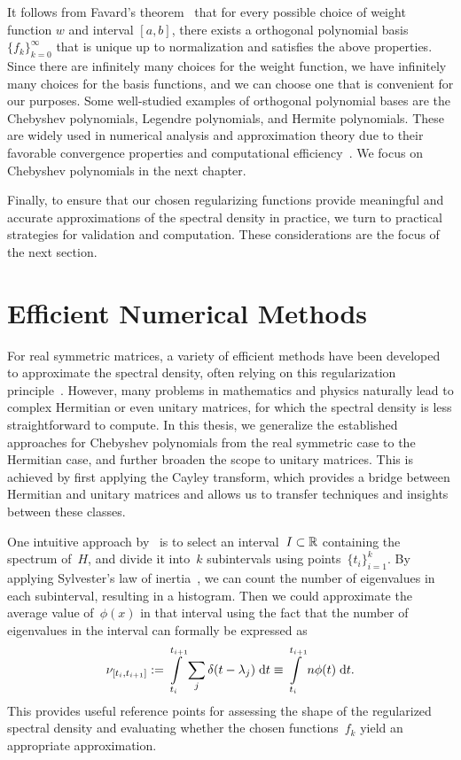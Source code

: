 It follows from Favard's theorem~\cite[Thm.~2.1]{szego1975} that for every possible choice of weight function $w$ and interval $[a, b]$, there exists a orthogonal polynomial basis $\{f_k\}_{k=0}^{\infty}$ that is unique up to normalization and satisfies the above properties. Since there are infinitely many choices for the weight function, we have infinitely many choices for the basis functions, and we can choose one that is convenient for our purposes. Some well-studied examples of orthogonal polynomial bases are the Chebyshev polynomials, Legendre polynomials, and Hermite polynomials. These are widely used in numerical analysis and approximation theory due to their favorable convergence properties and computational efficiency~\cite{masonhandscomb}. We focus on Chebyshev polynomials in the next chapter.

Finally, to ensure that our chosen regularizing functions provide meaningful and accurate approximations of the spectral density in practice, we turn to practical strategies for validation and computation. These considerations are the focus of the next section.

\section{Efficient Numerical Methods}
For real symmetric matrices, a variety of efficient methods have been developed to approximate the spectral density, often relying on this regularization principle~\cite{weisse2006,linsaadyang14,golub2013matrix}. However, many problems in mathematics and physics naturally lead to complex Hermitian or even unitary matrices, for which the spectral density is less straightforward to compute. In this thesis, we generalize the established approaches for Chebyshev polynomials from the real symmetric case to the Hermitian case, and further broaden the scope to unitary matrices. This is achieved by first applying the Cayley transform, which provides a bridge between Hermitian and unitary matrices and allows us to transfer techniques and insights between these classes.

One intuitive approach by~\cite{linsaadyang14} is to select an interval~$I \subset \mathbb{R}$ containing the spectrum of~$H$, and divide it into~$k$ subintervals using points~$\{t_i\}_{i=1}^k$. By applying Sylvester's law of inertia~\cite{sylvester1852}, we can count the number of eigenvalues in each subinterval, resulting in a histogram. Then we could approximate the average value of~$\phi(x)$ in that interval using the fact that the number of eigenvalues in the interval can formally be expressed as
\begin{equation} \label{eq:nu_a_b}
    \nu_{[t_i, t_{i+1}]} := \int\limits_{t_i}^{t_{i+1}} \sum_j \delta(t - \lambda_j) \;\mathrm{d}t \equiv \int\limits_{t_i}^{t_{i+1}} n \phi(t) \;\mathrm{d}t.
\end{equation}
This provides useful reference points for assessing the shape of the regularized spectral density and evaluating whether the chosen functions~$f_k$ yield an appropriate approximation.

